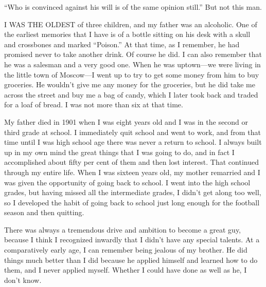 

\bbChapterPreamble




\begin{biblechapter}
    “Who is convinced against his will is of the same opinion still.”
\verse But not this man.
\end{biblechapter}


\begin{biblechapter}
    I WAS THE OLDEST of three children, 
    and my father was an alcoholic.
\verse One of the earliest memories that I have 
    is of a bottle sitting on his desk 
    with a skull and crossbones and marked “Poison.”
\verse At that time, as I remember, 
    he had promised never to take another drink.
\verse Of course he did.
\verse I can also remember that he was a salesman 
    and a very good one.
\verse When he was uptown—we were living in the little town of 
    Moscow—I went up to try to get some money from him 
    to buy groceries.
\verse He wouldn’t give me any money for the groceries, 
    but he did take me across the street 
    and buy me a bag of candy, 
    which I later took back 
    and traded for a loaf of bread.
\verse I was not more than six at that time.

\verse My father died in 1901 when I was eight years old 
    and I was in the second or third grade at school.
\verse I immediately quit school and went to work, 
    and from that time until I was high school age 
    there was never a return to school.
\verse I always built up in my own mind 
    the great things that I was going to do, 
    and in fact I accomplished about fifty per cent of them 
    and then lost interest.
\verse That continued through my entire life.
\verse When I was sixteen years old, 
    my mother remarried 
    and I was given the opportunity of going back to school.
\verse I went into the high school grades, 
    but having missed all the intermediate grades, 
    I didn’t get along too well, 
    so I developed the habit of going back to school 
    just long enough for the football season and then quitting.

\verse There was always a tremendous drive and ambition 
    to become a great guy, 
    because I think I recognized inwardly 
    that I didn’t have any special talents.
\verse At a comparatively early age, 
    I can remember being jealous of my brother.
\verse He did things much better than I did 
    because he applied himself 
    and learned how to do them, 
    and I never applied myself.
\verse Whether I could have done as well as he, I don’t know.
\end{biblechapter}


